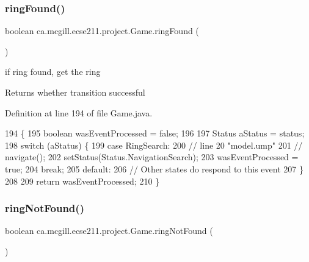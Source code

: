 \subsubsection{\texorpdfstring{ring\+Found()}{ringFound()}}
{\footnotesize\ttfamily boolean ca.\+mcgill.\+ecse211.\+project.\+Game.\+ring\+Found (\begin{DoxyParamCaption}{ }\end{DoxyParamCaption})}

if ring found, get the ring

\begin{DoxyReturn}{Returns}
whether transition successful 
\end{DoxyReturn}


Definition at line 194 of file Game.\+java.


\begin{DoxyCode}
194                              \{
195     \textcolor{keywordtype}{boolean} wasEventProcessed = \textcolor{keyword}{false};
196 
197     Status aStatus = status;
198     \textcolor{keywordflow}{switch} (aStatus) \{
199       \textcolor{keywordflow}{case} RingSearch:
200         \textcolor{comment}{// line 20 "model.ump"}
201         \textcolor{comment}{// navigate();}
202         setStatus(Status.NavigationSearch);
203         wasEventProcessed = \textcolor{keyword}{true};
204         \textcolor{keywordflow}{break};
205       \textcolor{keywordflow}{default}:
206         \textcolor{comment}{// Other states do respond to this event}
207     \}
208 
209     \textcolor{keywordflow}{return} wasEventProcessed;
210   \}
\end{DoxyCode}
\mbox{\label{enumca_1_1mcgill_1_1ecse211_1_1project_1_1_game_adc2725f291b0688a62f85db1df1ee2b2}} 
\subsubsection{\texorpdfstring{ring\+Not\+Found()}{ringNotFound()}}
{\footnotesize\ttfamily boolean ca.\+mcgill.\+ecse211.\+project.\+Game.\+ring\+Not\+Found (\begin{DoxyParamCaption}{ }\end{DoxyParamCaption})}

